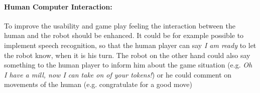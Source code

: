\documentclass[a4paper]{spie}  %
\begin{document}
\begin{large}
\paragraph{Human Computer Interaction:} To improve the usability and game play feeling the interaction between the human and the robot should be enhanced. It could be for example possible to implement speech recognition, so that the human player can say \emph{I am ready} to let the robot know, when it is his turn. The robot on the other hand could also say something to the human player to inform him about the game situation (e.g. \emph{Oh I have a mill, now I can take on of your tokens!}) or he could comment on movements of the human (e.g. congratulate for a good move)
\newpage



\end{large}
\end{document}
